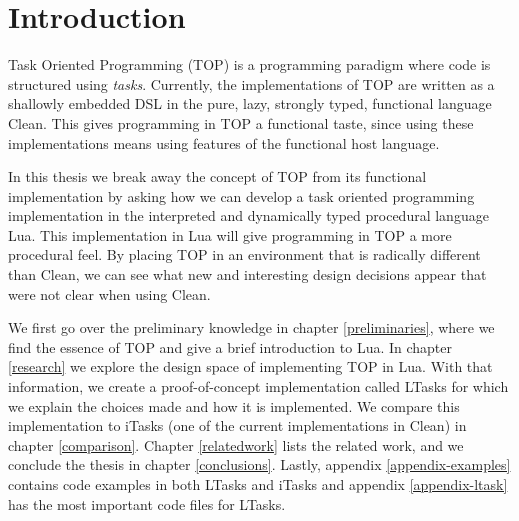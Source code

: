 \chapter{Introduction}\label{introduction}

Task Oriented Programming (TOP) is a programming paradigm where code is structured using \textit{tasks}. Currently, the implementations of TOP are written as a shallowly embedded DSL in the pure, lazy, strongly typed, functional language Clean. This gives programming in TOP a functional taste, since using these implementations means using features of the functional host language.

In this thesis we break away the concept of TOP from its functional implementation by asking how we can develop a task oriented programming implementation in the interpreted and dynamically typed procedural language Lua.
This implementation in Lua will give programming in TOP a more procedural feel.
By placing TOP in an environment that is radically different than Clean, we can see what new and interesting design decisions appear that were not clear when using Clean.

We first go over the preliminary knowledge in chapter \ref{preliminaries}, where we find the essence of TOP and give a brief introduction to Lua. In chapter \ref{research} we explore the design space of implementing TOP in Lua. With that information, we create a proof-of-concept implementation called LTasks for which we explain the choices made and how it is implemented. We compare this implementation to iTasks (one of the current implementations in Clean) in chapter \ref{comparison}. Chapter \ref{relatedwork} lists the related work, and we conclude the thesis in chapter \ref{conclusions}. Lastly, appendix \ref{appendix-examples} contains code examples in both LTasks and iTasks and appendix \ref{appendix-ltask} has the most important code files for LTasks.

